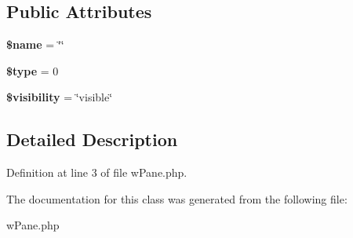 \subsection*{Public Attributes}
\begin{DoxyCompactItemize}
\item 
\hypertarget{classwPane_a0d588bc913c35cd31458ed1aaa665952}{
{\bfseries \$name} = \char`\"{}\char`\"{}}
\label{classwPane_a0d588bc913c35cd31458ed1aaa665952}

\item 
\hypertarget{classwPane_a451ef86704751fb05e90ccc4b5b4866b}{
{\bfseries \$type} = 0}
\label{classwPane_a451ef86704751fb05e90ccc4b5b4866b}

\item 
\hypertarget{classwPane_afda42b6f23d97d884842397df9344363}{
{\bfseries \$visibility} = \char`\"{}visible\char`\"{}}
\label{classwPane_afda42b6f23d97d884842397df9344363}

\end{DoxyCompactItemize}


\subsection{Detailed Description}


Definition at line 3 of file wPane.php.



The documentation for this class was generated from the following file:\begin{DoxyCompactItemize}
\item 
wPane.php\end{DoxyCompactItemize}
